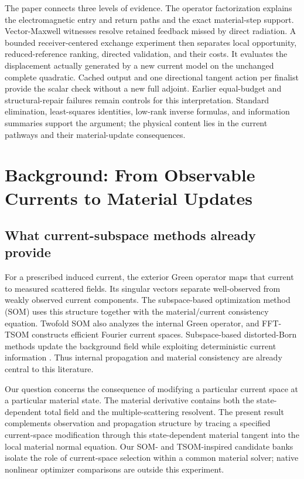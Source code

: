 \documentclass[journal]{IEEEtran}
\begin{document}
The paper connects three levels of evidence. The operator factorization explains the electromagnetic entry and return paths and the exact material-step support. Vector-Maxwell witnesses resolve retained feedback missed by direct radiation. A bounded receiver-centered exchange experiment then separates local opportunity, reduced-reference ranking, directed validation, and their costs. It evaluates the displacement actually generated by a new current model on the unchanged complete quadratic. Cached output and one directional tangent action per finalist provide the scalar check without a new full adjoint. Earlier equal-budget and structural-repair failures remain controls for this interpretation. Standard elimination, least-squares identities, low-rank inverse formulas, and information summaries support the argument; the physical content lies in the current pathways and their material-update consequences.

\section{Background: From Observable Currents to Material Updates}
\subsection{What current-subspace methods already provide}
For a prescribed induced current, the exterior Green operator maps that current to measured scattered fields. Its singular vectors separate well-observed from weakly observed current components. The subspace-based optimization method (SOM) uses this structure together with the material/current consistency equation. Twofold SOM also analyzes the internal Green operator, and FFT-TSOM constructs efficient Fourier current spaces. Subspace-based distorted-Born methods update the background field while exploiting deterministic current information \cite{r17,r1,r2,r3,r16}. Thus internal propagation and material consistency are already central to this literature.

Our question concerns the consequence of modifying a particular current space at a particular material state. The material derivative contains both the state-dependent total field and the multiple-scattering resolvent. The present result complements observation and propagation structure by tracing a specified current-space modification through this state-dependent material tangent into the local material normal equation. Our SOM- and TSOM-inspired candidate banks isolate the role of current-space selection within a common material solver; native nonlinear optimizer comparisons are outside this experiment.
\end{document}
